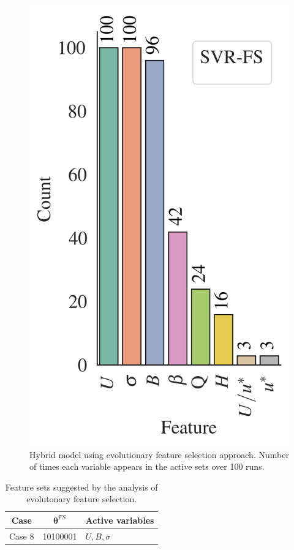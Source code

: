 \documentclass[a4paper,12pt, english]{article}
\newcommand{\xp}{\bm{\theta}}
\newcommand{\xfs}{\xp^{FS}}
\begin{document}
\begin{figure}[!htb]
    \includegraphics[height=0.35\textheight]{./results/eml____300dpi_active_features_distribution_svr_fs__count}
    \caption{\label{fig:eml____300dpi_active_features_distribution__count}
    Hybrid model using evolutionary feature selection approach.
    Number of times each variable appears in the active sets  over 100 runs.}
\end{figure}


\begin{table}[!htb]
    \centering
    \caption{ \label{tab:cases-features-fs} Feature sets suggested by the analysis of evolutonary feature selection.
    }
    \begin{tabular}{ccl}
    \hline
        Case   & $\xfs$ & Active variables                             \\ \hline
        Case 8 &  10100001  & $U ,     B,                      \sigma$    \\ \hline
\end{tabular}
\end{table}
\end{document}
